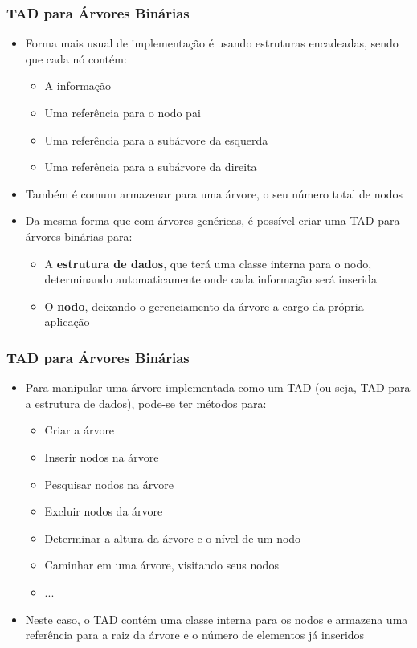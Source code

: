 \documentclass[aspectratio=169]{beamer}
\begin{document}
\begin{frame}\frametitle{TAD para Árvores Binárias}
\begin{itemize}
	\item Forma mais usual de implementação é usando estruturas encadeadas, sendo que cada nó contém:
	\begin{itemize}
		\item A informação
		\item Uma referência para o nodo pai
		\item Uma referência para a subárvore da esquerda
		\item Uma referência para a subárvore da direita
	\end{itemize}
	\item Também é comum armazenar para uma árvore, o seu número total de nodos
	\item Da mesma forma que com árvores genéricas, é possível criar uma TAD para árvores binárias para:
	\begin{itemize}
		\item A \textbf{estrutura de dados}, que terá uma classe interna para o nodo, determinando automaticamente onde cada informação será inserida
		\item O \textbf{nodo}, deixando o gerenciamento da árvore a cargo da própria aplicação
	\end{itemize}
\end{itemize}
\end{frame}

\begin{frame}\frametitle{TAD para Árvores Binárias}
\begin{itemize}
	\item Para manipular uma árvore implementada como um TAD (ou seja, TAD para a estrutura de dados), pode-se ter métodos para:
	\begin{itemize}
		\item Criar a árvore
		\item Inserir nodos na árvore
		\item Pesquisar nodos na árvore
		\item Excluir nodos da árvore
		\item Determinar a altura da árvore e o nível de um nodo
		\item Caminhar em uma árvore, visitando seus nodos
		\item ...
	\end{itemize}
	\item Neste caso, o TAD contém uma classe interna para os nodos e armazena uma referência para a raiz da árvore e o número de elementos já inseridos
\end{itemize}
\end{frame}
\end{document}
